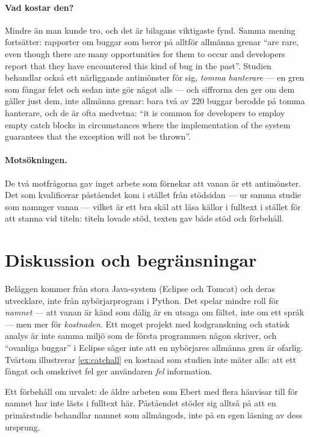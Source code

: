 \paragraph{Vad kostar den?}
Mindre än man kunde tro, och det är bilagans viktigaste fynd.  Samma
mening fortsätter: rapporter om buggar som beror på alltför allmänna
grenar \enquote{are rare, even though there are many opportunities for
them to occur and developers report that they have encountered this kind
of bug in the past}\autocite[83]{EbertCastor2015}.  Studien behandlar
också ett närliggande antimönster för sig, \emph{tomma hanterare} ---
en gren som fångar felet och sedan inte gör något alls --- och siffrorna
den ger om dem gäller just dem, inte allmänna grenar: bara två av 220
buggar berodde på tomma hanterare, och de är ofta medvetna: \enquote{it
is common for developers to employ empty catch blocks in circumstances
where the implementation of the system guarantees that the exception
will not be thrown}\autocite[99]{EbertCastor2015}.

\paragraph{Motsökningen.}
De två motfrågorna gav inget arbete som förnekar att vanan är ett
antimönster.  Det som kvalificerar påståendet kom i stället från
stödsidan --- ur samma studie som namnger vanan --- vilket är ett bra
skäl att läsa källor i fulltext i stället för att stanna vid titeln:
titeln lovade stöd, texten gav både stöd och förbehåll.

\section{Diskussion och begränsningar}
\label{sec:ca-diskussion}

Beläggen kommer från stora Java-system (Eclipse och Tomcat) och deras
utvecklare, inte från nybörjarprogram i Python.  Det spelar mindre roll
för \emph{namnet} --- att vanan är känd som dålig är en utsaga om
fältet, inte om ett språk --- men mer för \emph{kostnaden}.  Ett moget
projekt med kodgranskning och statisk analys är inte samma miljö som de
första programmen någon skriver, och \enquote{ovanliga buggar} i Eclipse
säger inte att en nybörjares allmänna gren är ofarlig.  Tvärtom illustrerar
\cref{ex:catchall} en kostnad som studien inte mäter alls: att ett fångat
och omskrivet fel ger användaren \emph{fel} information.

Ett förbehåll om urvalet: de äldre arbeten som Ebert med flera hänvisar
till för namnet har inte lästs i fulltext här.  Påståendet stöder sig
alltså på att en primärstudie behandlar namnet som allmängods, inte på en
egen läsning av dess ursprung.

